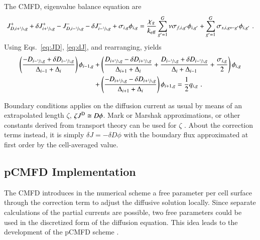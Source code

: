 \documentclass[review,3p,onecolumn,sort&compress]{elsarticle}
\newcommand{\keff}{\ensuremath{k_{\textrm{\scriptsize{eff}}}}}
\newcommand{\delj}{\ensuremath{\delta J}}
\newcommand{\jD}{\ensuremath{J^{\textrm{\scriptsize{D}}}}}
\newcommand{\hzi}{\ensuremath{\sfrac{1}{2}}}
\newcommand{\dx}{\Delta}
\newcommand{\dd}{\delta D}
\begin{document}
The CMFD, eigenvalue balance equation are 
\begin{equation}
	\label{eq:CMFD-diff}
	J^+_{D,i+\hzi,g} + \delj^+_{i+\hzi,g} - J^-_{D,i-\hzi,g} - \delj^-_{i-\hzi,g} + \sigma_{i,g}\phi_{i,g}= \frac{\chi_g}{\keff}\sum\limits_{g'=1}^G\nu\sigma_{f,i,g'}\phi_{i,g'} + \sum\limits_{g'=1}^G\sigma_{s,i,g\leftarrow g'}\phi_{i,g'}\,\,. 
\end{equation}
Using Eqs.~\eqref{eq:JD}, \eqref{eq:dJ}, and rearranging, yields
\begin{equation}
	\label{eq:CMFD-diff-rearranged}
	\begin{split}
	\left( \frac{-D_{i-\hzi,g} + \dd_{i-\hzi,g}}{\dx_{i-1} + \dx_i}\right)\phi_{i-1,g}
	& + \left(\frac{D_{i+\hzi,g} - \dd_{i+\hzi,g}}{\dx_{i+1} + \dx_i} + \frac{D_{i-\hzi,g} + \dd_{i-\hzi,g}}{\dx_i + \dx_{i-1}} + \frac{\sigma_{i,g}}{2}\right) \phi_{i,g} \\
	& + \left( \frac{-D_{i+\hzi,g} - \dd_{i+\hzi,g}}{\dx_{i+1} + \dx_i} \right) \phi_{i+1,g} = \frac{1}{2}q_{i,g}\,\,.
	\end{split}
\end{equation}



Boundary conditions applies on the diffusion current as usual by means of an extrapolated length $\zeta$, $\zeta \jD \cong D \phi$. Mark or Marshak approximations, or other constants derived from transport theory can be used for $\zeta$ \cite{meghreblian1960reactor}. About the correction terms instead, it is simply $\delta J = -\delta D \phi$ with the boundary flux approximated at first order by the cell-averaged value.

\subsection{pCMFD Implementation}
\label{sec:RM-pCMFD}

The CMFD introduces in the numerical scheme a free parameter per cell surface through the correction term to adjust the diffusive solution locally. Since separate calculations of the partial currents are possible, two free parameters could be used in the discretized form of the diffusion equation. This idea leads to the development of the pCMFD scheme \cite{cho2003comparison}.
\end{document}
